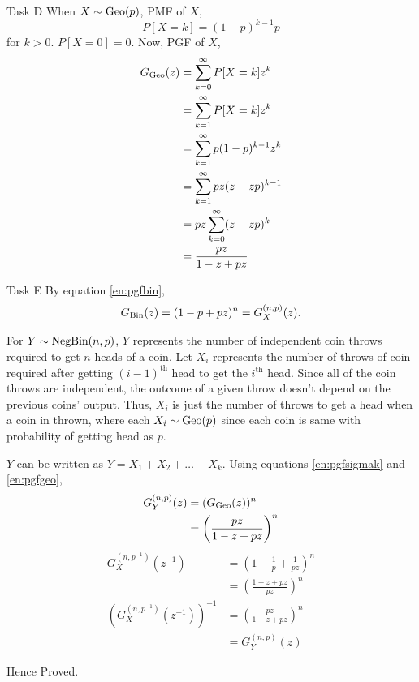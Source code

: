 \begin{task}{ Task D }
	When $X\sim\text{Geo}(p)$, PMF of $X$,
	\begin{equation}
		P[X=k] = (1-p)^{k-1}p
	\end{equation}
	for $k>0$. $P[X=0]=0$. Now, PGF of $X$,
	\begin{align}
		G_{\text{Geo}}(z) & = \sum_{k=0}^\infty P[X=k]z^k       \\
		          & = \sum_{k=1}^\infty P[X=k]z^k       \\
		          & = \sum_{k=1}^\infty p(1-p)^{k-1}z^k \\
		          & = \sum_{k=1}^\infty pz(z-zp)^{k-1}  \\
		          & = pz\sum_{k=0}^\infty (z-zp)^k      \\
		          & = \frac{pz}{1-z+pz}
		\label{en:pgfgeo}
	\end{align}
\end{task}



\begin{task}{ Task E }
	By equation \ref{en:pgfbin},
	\begin{align}
		G_{\text{Bin}}(z) = (1-p + pz)^n = G_X^{(n,p)}(z).
	\end{align}

	For $Y\sim\text{NegBin}(n,p)$, $Y$ represents the number of independent coin
	throws required to get $n$ heads of a coin. Let $X_i$ represents the
	number of throws of coin required after getting $(i-1)^\text{th}$ head
	to get the $i^\text{th}$ head. Since all of the coin throws are
	independent, the outcome of a given throw doesn't depend on the
	previous coins' output. Thus, $X_i$ is just the number of throws to get
	a head when a coin in thrown, where each $X_i\sim\text{Geo}(p)$ since each
	coin is same with probability of getting head as $p$.

	$Y$ can be written as $Y=X_1+X_2+\dots+X_k$. Using equations
	\ref{en:pgfsigmak} and \ref{en:pgfgeo},
	\begin{align}
		G_Y^{(n,p)}(z) & = (G_{\text{Geo}}(z))^n                    \\
		               & = \left(\frac{pz}{1-z+pz}\right)^n \\
		\label{en:pgfnegbin}
	\end{align}
	\begin{align}
		G_X^{(n,p^{-1})}(z^{-1})                   & =
		\left(1-\frac{1}{p} + \frac{1}{pz}\right)^n                   \\
		                                           & =
		\left(\frac{1-z+pz}{pz}\right)^n
		\\
		\left(G_X^{(n,p^{-1})}(z^{-1})\right)^{-1} & =
		\left(\frac{pz}{1-z+pz}\right)^n
		\\
		                                           & = G_Y^{(n,p)}(z)
	\end{align}

	Hence Proved.
\end{task}



